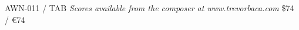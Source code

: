 \documentclass{article}
\begin{document}
\null \vfill

AWN-011 / TAB \hfill
\textit{Scores available from the composer at www.trevorbaca.com}
\hfill \$74 / \euro 74
\end{document}
